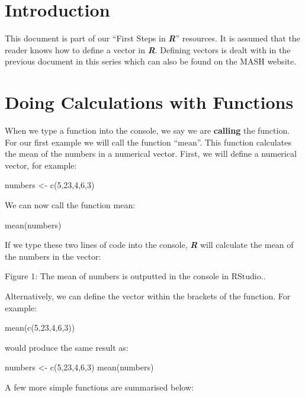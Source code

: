 \documentclass[
]{book}
\begin{document}
\section{Introduction}\label{introduction-3}

This document is part of our ``First Steps in \textbf{\emph{R}}'' resources. It is assumed that the reader knows how to define a vector in \textbf{\emph{R}}. Defining vectors is dealt with in the previous document in this series which can also be found on the MASH website.

\section{Doing Calculations with Functions}\label{doing-calculations-with-functions}

When we type a function into the console, we say we are \textbf{calling} the function. For our first example we will call the function ``mean''. This function calculates the mean of the numbers in a numerical vector. First, we will define a numerical vector, for example:

numbers \textless- c(5,23,4,6,3)

We can now call the function mean:

mean(numbers)

If we type these two lines of code into the console, \textbf{\emph{R}} will calculate the mean of the numbers in the vector:

Figure 1: The mean of numbers is outputted in the console in RStudio..

Alternatively, we can define the vector within the brackets of the function. For example:

mean(c(5,23,4,6,3))

would produce the same result as:

numbers \textless- c(5,23,4,6,3)
mean(numbers)

A few more simple functions are summarised below:
\end{document}
